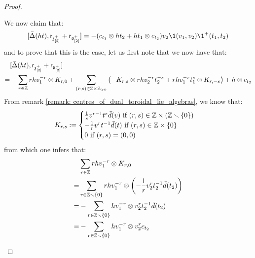 \begin{proof}
\begin{enumerate}
                        We now claim that:
                            $$[\bar{\Delta}(ht), \sfr_{\z_{[2]}^+} + \sfr_{\d_{[2]}^+}] = -( c_{t_1} \tensor ht_2 + ht_1 \tensor c_{t_2} ) v_2 \1(v_1, v_2) \1^+(t_1, t_2)$$
                        and to prove that this is the case, let us first note that we now have that:
                            $$
                                \begin{aligned}
                                    & [\bar{\Delta}(ht), \sfr_{\z_{[2]}^+} + \sfr_{\d_{[2]}^+}]
                                    \\
                                    = & -\sum_{r \in \Z} r h v_1^{-r} \tensor K_{r, 0} + \sum_{(r, s) \in \Z \x \Z_{> 0}} \left( -K_{r, s} \tensor r h v_2^{-r} t_2^{-s} + r h v_1^{-r} t_1^s \tensor K_{r, -s} \right) + h \tensor c_{t_2}
                                \end{aligned}
                            $$
                        From remark \ref{remark: centres_of_dual_toroidal_lie_algebras}, we know that:
                            $$
                                K_{r, s} :=
                                \begin{cases}
                                    \text{$\frac1s v^{r - 1} t^s \bar{d}(v)$ if $(r, s) \in \Z \x (\Z \setminus \{0\})$}
                                    \\
                                    \text{$-\frac1r v^r t^{-1} \bar{d}(t)$ if $(r, s) \in \Z \x \{0\}$}
                                    \\
                                    \text{$0$ if $(r, s) = (0, 0)$}
                                \end{cases}
                            $$
                        from which one infers that:
                            $$
                                \begin{aligned}
                                    & \sum_{r \in \Z} r h v_1^{-r} \tensor K_{r, 0}
                                    \\
                                    = & \sum_{r \in \Z \setminus \{0\}} r h v_1^{-r} \tensor \left( -\frac1r v_2^r t_2^{-1} \bar{d}(t_2) \right)
                                    \\
                                    = & -\sum_{r \in \Z \setminus \{0\}} h v_1^{-r} \tensor v_2^r t_2^{-1} \bar{d}(t_2)
                                    \\
                                    = & -\sum_{r \in \Z \setminus \{0\}} h v_1^{-r} \tensor v_2^r c_{t_2}

\end{aligned}$$
\end{enumerate}
\end{proof}

